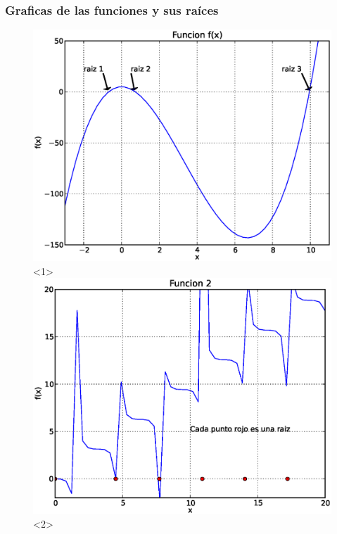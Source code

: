 \documentclass[12pt]{beamer}
\begin{document}
\begin{frame}
\frametitle{Graficas de las funciones y sus raíces}
\begin{figure}
	\centering
	\includegraphics[scale=0.4]{Imagenes/ejercicio1_Biseccion.eps}<1>
	\includegraphics[scale=0.4]{Imagenes/ejercicio2_Biseccion.eps}<2>
\end{figure}
\end{frame}
\end{document}
